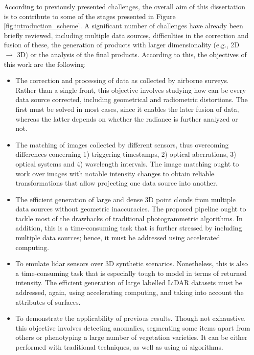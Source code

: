 According to previously presented challenges, the overall aim of this dissertation is to contribute to some of the stages presented in Figure \ref{fig:introduction_scheme}. A significant number of challenges have already been briefly reviewed, including multiple data sources, difficulties in the correction and fusion of these, the generation of products with larger dimensionality (e.g., 2D $\rightarrow$ 3D) or the analysis of the final products. According to this, the objectives of this work are the following:
\begin{itemize}
    \item The correction and processing of data as collected by airborne surveys. Rather than a single front, this objective involves studying how can be every data source corrected, including geometrical and radiometric distortions. The first must be solved in most cases, since it enables the later fusion of data, whereas the latter depends on whether the radiance is further analyzed or not.
    \item The matching of images collected by different sensors, thus overcoming differences concerning 1) triggering timestamps, 2) optical aberrations, 3) optical systems and 4) wavelength intervals. The image matching ought to work over images with notable intensity changes to obtain reliable transformations that allow projecting one data source into another. 
    \item The efficient generation of large and dense 3D point clouds from multiple data sources without geometric inaccuracies. The proposed pipeline ought to tackle most of the drawbacks of traditional photogrammetric algorithms. In addition, this is a time-consuming task that is further stressed by including multiple data sources; hence, it must be addressed using accelerated computing.
    \item To emulate \acrshort{lidar} sensors over 3D synthetic scenarios. Nonetheless, this is also a time-consuming task that is especially tough to model in terms of returned intensity. The efficient generation of large labelled LiDAR datasets must be addressed, again, using accelerating computing, and taking into account the attributes of surfaces.
    \item To demonstrate the applicability of previous results. Though not exhaustive, this objective involves detecting anomalies, segmenting some items apart from others or phenotyping a large number of vegetation varieties. It can be either performed with traditional techniques, as well as using \acrshort{ai} algorithms.
\end{itemize}

